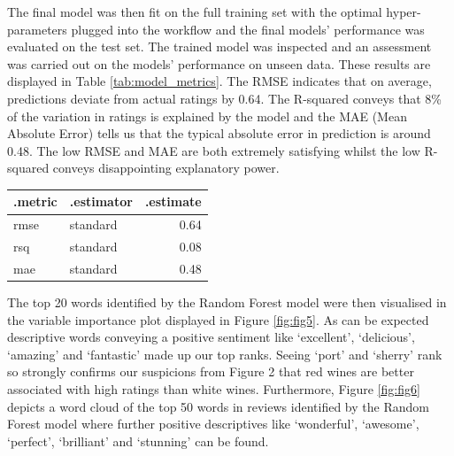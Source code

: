\documentclass[11pt,preprint]{elsarticle}
\let\origtable\table
\let\endorigtable\endtable
\renewenvironment{table}[1][2] {
    \expandafter\origtable\expandafter[H]
} {
    \endorigtable
}
\numberwithin{equation}{section}
\numberwithin{figure}{section}
\numberwithin{table}{section}
\begin{document}
The final model was then fit on the full training set with the optimal
hyper-parameters plugged into the workflow and the final models'
performance was evaluated on the test set. The trained model was
inspected and an assessment was carried out on the models' performance
on unseen data. These results are displayed in Table
\ref{tab:model_metrics}. The RMSE indicates that on average, predictions
deviate from actual ratings by 0.64. The R-squared conveys that 8\% of
the variation in ratings is explained by the model and the MAE (Mean
Absolute Error) tells us that the typical absolute error in prediction
is around 0.48. The low RMSE and MAE are both extremely satisfying
whilst the low R-squared conveys disappointing explanatory power.

\begin{table}[ht]
\centering
\begin{tabular}{|l|l|r|}
\hline
\textbf{.metric} & \textbf{.estimator} & \textbf{.estimate} \\
\hline
rmse & standard & 0.64 \\
rsq  & standard & 0.08 \\
mae  & standard & 0.48 \\
\hline
\end{tabular}
\caption{Model Performance Metrics}
\label{tab:model_metrics}
\end{table}

The top 20 words identified by the Random Forest model were then
visualised in the variable importance plot displayed in Figure
\ref{fig:fig5}. As can be expected descriptive words conveying a
positive sentiment like `excellent', `delicious', `amazing' and
`fantastic' made up our top ranks. Seeing `port' and `sherry' rank so
strongly confirms our suspicions from Figure 2 that red wines are better
associated with high ratings than white wines. Furthermore, Figure
\ref{fig:fig6} depicts a word cloud of the top 50 words in reviews
identified by the Random Forest model where further positive
descriptives like `wonderful', `awesome', `perfect', `brilliant' and
`stunning' can be found.
\end{document}
